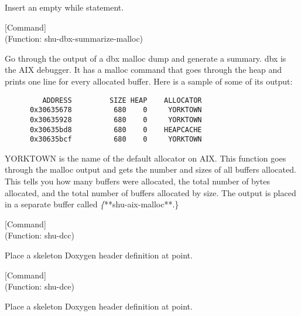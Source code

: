 \begin{doc-string}
Insert an empty while statement.
\end{doc-string}

\vspace{1em}
\noindent
{}
\usebox{\funcname}
 \hfill [Command]\\%
 (Function: shu-dbx-summarize-malloc)

\begin{doc-string}
Go through the output of a dbx malloc dump and generate a summary.  dbx is
the AIX debugger.  It has a malloc command that goes through the heap and prints
one line for every allocated buffer.  Here is a sample of some of its output:

\small{\begin{verbatim}
         ADDRESS         SIZE HEAP    ALLOCATOR
      0x30635678          680    0     YORKTOWN
      0x30635928          680    0     YORKTOWN
      0x30635bd8          680    0    HEAPCACHE
      0x30635bcf          680    0     YORKTOWN
\end{verbatim}}

YORKTOWN is the name of the default allocator on AIX.  This function goes
through the malloc output and gets the number and sizes of all buffers
allocated.  This tells you how many buffers were allocated, the total number of
bytes allocated, and the total number of buffers allocated by size.  The output
is placed in a separate buffer called \emph\{**shu-aix-malloc**.\}
\end{doc-string}

\vspace{1em}
\noindent
{}
\usebox{\funcname}
 \hfill [Command]\\%
 (Function: shu-dcc)

\begin{doc-string}
Place a skeleton Doxygen header definition at point.
\end{doc-string}

\vspace{1em}
\noindent
{}
\usebox{\funcname}
 \hfill [Command]\\%
 (Function: shu-dce)

\begin{doc-string}
Place a skeleton Doxygen header definition at point.
\end{doc-string}

